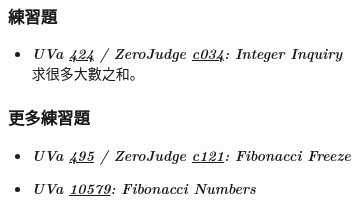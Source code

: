 \subsubsection*{練習題}
\begin{itemize}[label={\Checkmark}]
\item \textbf{\textit{UVa \href{http://uva.onlinejudge.org/external/4/424.html}{424} / ZeroJudge \href{http://zerojudge.tw/ShowProblem?problemid=c034}{c034}: Integer Inquiry}}\\
求很多大數之和。
\end{itemize}
\subsubsection*{更多練習題}
\begin{itemize}[label={\PencilLeftDown}]
\item \textbf{\textit{UVa \href{http://uva.onlinejudge.org/external/4/495.html}{495} / ZeroJudge \href{http://zerojudge.tw/ShowProblem?problemid=c121}{c121}: Fibonacci Freeze}}
\item \textbf{\textit{UVa \href{http://uva.onlinejudge.org/external/105/10579.html}{10579}: Fibonacci Numbers}}
\end{itemize}